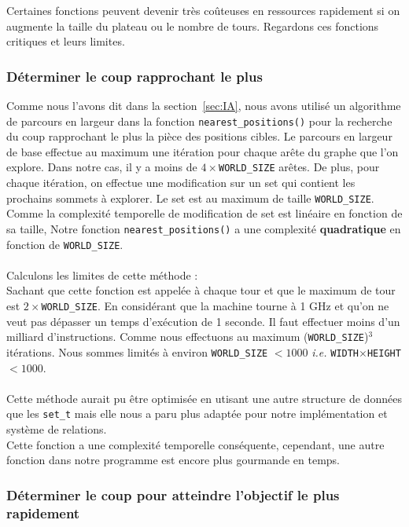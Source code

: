 \documentclass{article}
\begin{document}
Certaines fonctions peuvent devenir très coûteuses en ressources rapidement si on augmente la taille du plateau ou le nombre de tours.
Regardons ces fonctions critiques et leurs limites.

\subsubsection{Déterminer le coup rapprochant le plus}

Comme nous l'avons dit dans la section~\ref{sec:IA}, nous avons utilisé un algorithme de parcours en largeur dans la fonction \lstinline{nearest_positions()} pour la recherche du coup rapprochant le plus la pièce des positions cibles.
Le parcours en largeur de base effectue au maximum une itération pour chaque arête du graphe que l'on explore.
Dans notre cas, il y a moins de $4 \times$\lstinline{WORLD_SIZE} arêtes.
De plus, pour chaque itération, on effectue une modification sur un set qui contient les prochains sommets à explorer.
Le set est au maximum de taille \lstinline{WORLD_SIZE}.
Comme la complexité temporelle de modification de set est linéaire en fonction de sa taille, Notre fonction \lstinline{nearest_positions()} a une complexité \textbf{quadratique} en fonction de \lstinline{WORLD_SIZE}.
\\\\
Calculons les limites de cette méthode :\\
Sachant que cette fonction est appelée à chaque tour et que le maximum de tour est $2 \times$\lstinline{WORLD_SIZE}.
En considérant que la machine tourne à 1 GHz et qu'on ne veut pas dépasser un temps d'exécution de 1 seconde.
Il faut effectuer moins d'un milliard d'instructions. Comme nous effectuons au maximum (\lstinline{WORLD_SIZE})$^3$ itérations.
Nous sommes limités à environ \lstinline{WORLD_SIZE} $< 1000$ \textit{i.e.} \lstinline{WIDTH}$\times$\lstinline{HEIGHT} $< 1000$.
\\\\
Cette méthode aurait pu être optimisée en utisant une autre structure de données que les \lstinline{set_t} mais elle nous a paru plus adaptée pour notre implémentation et système de relations.
\\
Cette fonction a une complexité temporelle conséquente, cependant, une autre fonction dans notre programme est encore plus gourmande en temps.

\subsubsection{Déterminer le coup pour atteindre l'objectif le plus rapidement}
\end{document}
